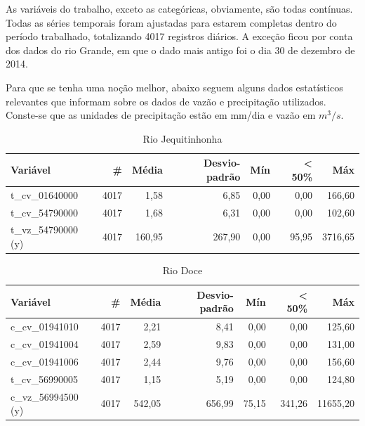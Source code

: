As variáveis do trabalho, exceto as categóricas, obviamente, são todas contínuas. Todas as séries temporais foram ajustadas para estarem completas dentro do período trabalhado, totalizando 4017 registros diários. A exceção ficou por conta dos dados do rio Grande, em que o dado mais antigo foi o dia 30 de dezembro de 2014.

Para que se tenha uma noção melhor, abaixo seguem alguns dados estatísticos relevantes que informam sobre os dados de vazão e precipitação utilizados. Conste-se que as unidades de precipitação estão em mm/dia e vazão em $m^3/s$.

\begin{table}[!h]
\centering \small
\caption{Rio Jequitinhonha}
\begin{tabular}{|l|r|r|r|r|r|r|} \hline 
\textbf{Variável}   & \textbf{\#} & \textbf{Média} & \textbf{Desvio-padrão} & \textbf{Mín} & \textbf{< 50\%} & \textbf{Máx} \\\hline
t\_cv\_01640000     & 4017        & 1,58           & 6,85                   & 0,00         & 0,00            & 166,60       \\\hline
t\_cv\_54790000     & 4017        & 1,68           & 6,31                   & 0,00         & 0,00            & 102,60       \\\hline
t\_vz\_54790000 (y) & 4017        & 160,95         & 267,90                 & 0,00         & 95,95           & 3716,65      \\\hline
\end{tabular}
\label{tab:variaveis_jequitinhonha}
\end{table}

\begin{table}[!h]
\centering \small
\caption{Rio Doce}
\begin{tabular}{|l|r|r|r|r|r|r|} \hline 
\textbf{Variável}   & \textbf{\#} & \textbf{Média} & \textbf{Desvio-padrão} & \textbf{Mín} & \textbf{< 50\%} & \textbf{Máx} \\\hline
c\_cv\_01941010     & 4017        & 2,21           & 8,41                   & 0,00         & 0,00            & 125,60       \\\hline
c\_cv\_01941004     & 4017        & 2,59           & 9,83                   & 0,00         & 0,00            & 131,00       \\\hline
c\_cv\_01941006     & 4017        & 2,44           & 9,76                   & 0,00         & 0,00            & 156,60       \\\hline
t\_cv\_56990005     & 4017        & 1,15           & 5,19                   & 0,00         & 0,00            & 124,80       \\\hline
c\_vz\_56994500 (y) & 4017        & 542,05         & 656,99                 & 75,15        & 341,26          & 11655,20     \\\hline
\end{tabular}
\label{tab:variaveis_rio_doce}
\end{table}

